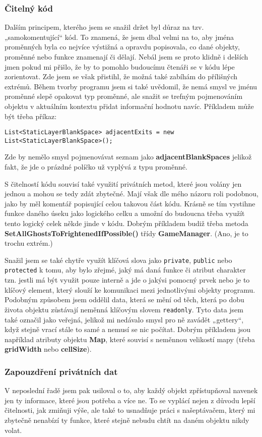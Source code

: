 \documentclass[a4]{article}
\begin{document}
\subsubsection{Čitelný kód}
Dalším principem, kterého jsem se snažil držet byl důraz na tzv. „samokomentující“ kód. To znamená, že jsem dbal velmi na to, aby jména proměnných byla co nejvíce výstižná a opravdu popisovala, co dané objekty, proměnné nebo funkce znamenají či dělají. Nebál jsem se proto klidně i delších jmen pokud mi přišlo, že by to pomohlo budoucímu čtenáři se v kódu lépe zorientovat. Zde jsem se však přistihl, že možná také zabíhám do přílišných extrémů. Během tvorby programu jsem si také uvědomil, že nemá smysl ve jménu proměnné slepě opakovat typ proměnné, ale snažit se trefným pojmenováním objektu v aktuálním kontextu přidat informační hodnotu navíc. Příkladem může být třeba příkaz: 

\verb|List<StaticLayerBlankSpace> adjacentExits = new List<StaticLayerBlankSpace>();|

Zde by nemělo smysl pojmenovávat seznam jako \textbf{adjacentBlankSpaces} jelikož fakt, že jde o prázdné políčko už vyplývá z typu proměnné.

S čitelností kódu souvisí také využití privátních metod, které jsou volány jen jednou a mohou se tedy zdát zbytečné. Mají však dle mého názoru roli podobnou, jako by měl komentář popisující celou takovou část kódu. Krásně se tím vystihne funkce daného úseku jako logického celku a umožní do budoucna třeba využít tento logický celek někde jinde v kódu. Dobrým příkladem budiž třeba metoda \textbf{SetAllGhostsToFrightenedIfPossible()} třídy \textbf{GameManager}. (Ano, je to trochu extrém.)

Snažil jsem se také chytře využít klíčová slova jako \verb|private|, \verb|public| nebo \verb|protected| k tomu, aby bylo zřejmé, jaký má daná funkce či atribut charakter tzn. jestli má být využit pouze interně a jde o jakýsi pomocný prvek nebo je to klíčový element, který slouží ke komunikaci mezi jednotlivými objekty programu. Podobným způsobem jsem oddělil data, která se mění od těch, která po dobu života objektu zůstávají neměnná klíčovým slovem \verb|readonly|. Tyto data jsem také označil jako veřejná, jelikož mi nedávalo smysl pro ně zavádět „gettery“, když stejně vrací stále to samé a nemusí se nic počítat. Dobrým příkladem jsou například atributy objektu \textbf{Map}, které souvisí s neměnnou velikostí mapy (třeba \textbf{gridWidth} nebo \textbf{cellSize}).

\subsubsection{Zapouzdření privátních dat}
V neposlední řadě jsem pak usiloval o to, aby každý objekt zpřístupňoval navenek jen ty informace, které jsou potřeba a více ne. To se vyplácí nejen z důvodu lepší čitelnosti, jak zmiňuji výše, ale také to usnadňuje práci s našeptávačem, který mi zbytečně nenabízí ty funkce, které stejně nebudu chtít na daném objektu nikdy volat.
\end{document}
